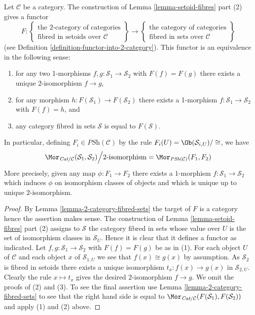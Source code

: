 \begin{lemma}
\label{lemma-2-category-fibred-setoids}
Let $\mathcal{C}$ be a category. The construction of
Lemma \ref{lemma-setoid-fibres}
part (2) gives a functor
$$
F :
\left\{
\begin{matrix}
\text{the 2-category of categories}\\
\text{fibred in setoids over }\mathcal{C}
\end{matrix}
\right\}
\longrightarrow
\left\{
\begin{matrix}
\text{the category of categories}\\
\text{fibred in sets over }\mathcal{C}
\end{matrix}
\right\}
$$
(see
Definition \ref{definition-functor-into-2-category}).
This functor is an equivalence in the following sense:
\begin{enumerate}
\item for any two 1-morphisms $f, g : \mathcal{S}_1 \to \mathcal{S}_2$
with $F(f) = F(g)$ there exists a unique 2-isomorphism $f \to g$,
\item for any morphism $h : F(\mathcal{S}_1) \to F(\mathcal{S}_2)$
there exists a 1-morphism $f : \mathcal{S}_1 \to \mathcal{S}_2$
with $F(f) = h$, and
\item any category fibred in sets $\mathcal{S}$ is equal to $F(\mathcal{S})$.
\end{enumerate}
In particular, defining $F_i \in \textit{PSh}(\mathcal{C})$ by the
rule $F_i(U) = \Ob(\mathcal{S}_{i, U})/\cong$, we have
$$
\Mor_{\textit{Cat}/\mathcal{C}}(\mathcal{S}_1, \mathcal{S}_2)
\Big/
2\text{-isomorphism}
=
\Mor_{\textit{PSh}(\mathcal{C})}(F_1, F_2)
$$
More precisely, given any map $\phi : F_1 \to F_2$ there exists a
$1$-morphism $f : \mathcal{S}_1 \to \mathcal{S}_2$ which induces
$\phi$ on isomorphism classes of objects and
which is unique up to unique $2$-isomorphism.
\end{lemma}

\begin{proof}
By
Lemma \ref{lemma-2-category-fibred-sets}
the target of $F$ is a category hence the assertion makes sense.
The construction of
Lemma \ref{lemma-setoid-fibres} part (2)
assigns to $\mathcal{S}$ the category fibred in sets whose value over
$U$ is the set of isomorphism classes in $\mathcal{S}_U$. Hence it
is clear that it defines a functor as indicated.
Let $f, g : \mathcal{S}_1 \to \mathcal{S}_2$
with $F(f) = F(g)$ be as in (1). For each object $U$ of $\mathcal{C}$
and each object $x$ of $\mathcal{S}_{1, U}$ we see that $f(x) \cong g(x)$
by assumption. As $\mathcal{S}_2$ is fibred in setoids there exists
a unique isomorphism $t_x : f(x) \to g(x)$ in $\mathcal{S}_{2, U}$.
Clearly the rule $x \mapsto t_x$ gives the desired $2$-isomorphism
$f \to g$. We omit the proofs of (2) and (3).
To see the final assertion use
Lemma \ref{lemma-2-category-fibred-sets}
to see that the right hand side is equal to
$\Mor_{\textit{Cat}/\mathcal{C}}(F(\mathcal{S}_1), F(\mathcal{S}_2))$
and apply (1) and (2) above.
\end{proof}

